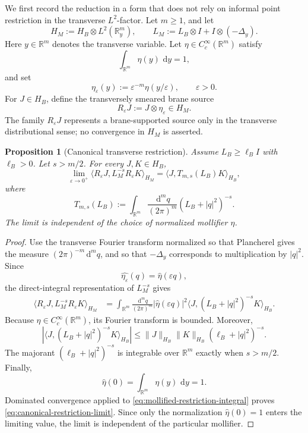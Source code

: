 \documentclass[11pt]{article}
\newtheorem{proposition}[theorem]{Proposition}
\newcommand{\R}{\mathbb{R}}
\newcommand{\dd}{\,\mathrm{d}}
\begin{document}
We first record the reduction in a form that does not rely on informal
point restriction in the transverse \(L^2\)-factor.  Let \(m\geq1\), and
let
\[
    H_M:=H_B\otimes L^2(\R^m_y),
    \qquad
    L_M:=L_B\otimes I+I\otimes(-\Delta_y).
\]
Here \(y\in\R^m\) denotes the transverse variable.  Let
\(\eta\in C_c^\infty(\R^m)\) satisfy
\[
    \int_{\R^m}\eta(y)\,\dd y=1,
\]
and set
\[
    \eta_\varepsilon(y):=\varepsilon^{-m}\eta(y/\varepsilon),
    \qquad \varepsilon>0.
\]
For \(J\in H_B\), define the transversely smeared brane source
\[
    R_\varepsilon J:=J\otimes\eta_\varepsilon\in H_M.
\]
The family \(R_\varepsilon J\) represents a brane-supported source only in
the transverse distributional sense; no convergence in \(H_M\) is asserted.

\begin{proposition}[Canonical transverse restriction]
\label{prop:canonical-transverse-restriction}
Assume \(L_B\geq \ell_B I\) with \(\ell_B>0\).  Let \(s>m/2\).  For every
\(J,K\in H_B\),
\begin{equation}
    \lim_{\varepsilon\to0^+}
    \big\langle R_\varepsilon J,
    L_M^{-s}R_\varepsilon K\big\rangle_{H_M}
    =
    \big\langle J,T_{m,s}(L_B)K\big\rangle_{H_B},
    \label{eq:canonical-restriction-limit}
\end{equation}
where
\begin{equation}
    T_{m,s}(L_B)
    :=
    \int_{\R^m}
    \frac{\dd^m q}{(2\pi)^m}
    (L_B+|q|^2)^{-s}.
    \label{eq:Tms-definition}
\end{equation}
The limit is independent of the choice of normalized mollifier
\(\eta\).
\end{proposition}

\begin{proof}
Use the transverse Fourier transform normalized so that Plancherel gives
the measure \((2\pi)^{-m}\dd^m q\), and so that \(-\Delta_y\) corresponds
to multiplication by \(|q|^2\).  Since
\[
    \widehat{\eta_\varepsilon}(q)=\widehat{\eta}(\varepsilon q),
\]
the direct-integral representation of \(L_M^{-s}\) gives
\begin{align}
    \big\langle R_\varepsilon J,
    L_M^{-s}R_\varepsilon K\big\rangle_{H_M}
    &=
    \int_{\R^m}
    \frac{\dd^m q}{(2\pi)^m}
    \left|\widehat{\eta}(\varepsilon q)\right|^2
    \big\langle J,(L_B+|q|^2)^{-s}K\big\rangle_{H_B}.
    \label{eq:mollified-restriction-integral}
\end{align}
Because \(\eta\in C_c^\infty(\R^m)\), its Fourier transform is bounded.
Moreover,
\[
    \left|
    \big\langle J,(L_B+|q|^2)^{-s}K\big\rangle_{H_B}
    \right|
    \leq
    \|J\|_{H_B}\|K\|_{H_B}(\ell_B+|q|^2)^{-s}.
\]
The majorant \((\ell_B+|q|^2)^{-s}\) is integrable over \(\R^m\) exactly
when \(s>m/2\).  Finally,
\[
    \widehat{\eta}(0)=\int_{\R^m}\eta(y)\,\dd y=1.
\]
Dominated convergence applied to
\eqref{eq:mollified-restriction-integral} proves
\eqref{eq:canonical-restriction-limit}.  Since only the normalization
\(\widehat{\eta}(0)=1\) enters the limiting value, the limit is independent
of the particular mollifier.
\end{proof}
\end{document}
